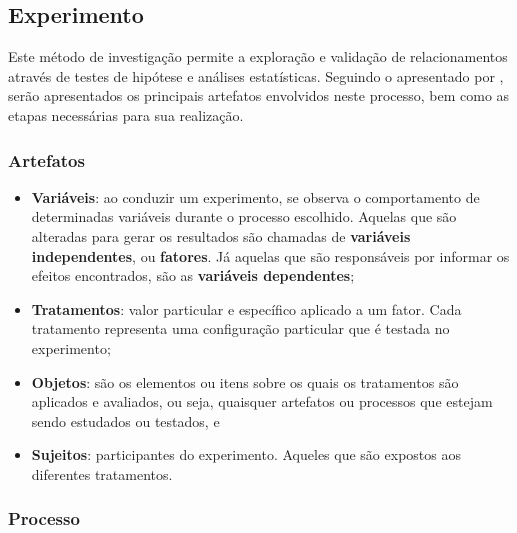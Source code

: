 

\subsection{Experimento}

Este método de investigação permite a exploração e validação de relacionamentos através de testes de hipótese e análises estatísticas. Seguindo o apresentado por , serão apresentados os principais artefatos envolvidos neste processo, bem como as etapas necessárias para sua realização.

\subsubsection{Artefatos}

\begin{itemize}
    \item \textbf{Variáveis}: ao conduzir um experimento, se observa o comportamento de determinadas variáveis durante o processo escolhido. Aquelas que são alteradas para gerar os resultados são chamadas de \textbf{variáveis independentes}, ou \textbf{fatores}. Já aquelas que são responsáveis por informar os efeitos encontrados, são as \textbf{variáveis dependentes};
    \item \textbf{Tratamentos}: valor particular e específico aplicado a um fator. Cada tratamento representa uma configuração particular que é testada no experimento;
    \item \textbf{Objetos}: são os elementos ou itens sobre os quais os tratamentos são aplicados e avaliados, ou seja, quaisquer artefatos ou processos que estejam sendo estudados ou testados, e
    \item \textbf{Sujeitos}: participantes do experimento. Aqueles que são expostos aos diferentes tratamentos.
\end{itemize}

\subsubsection{Processo}

